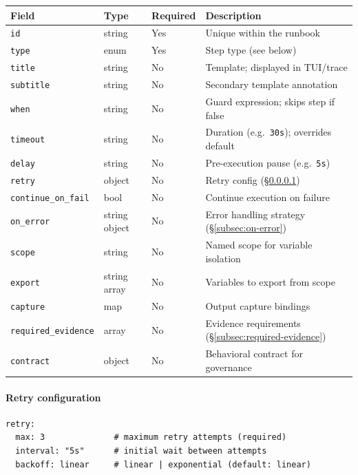 \begin{center}
\begin{tabular}{lllp{5.5cm}}
\hline
\textbf{Field} & \textbf{Type} & \textbf{Required} & \textbf{Description} \\
\hline
\texttt{id}              & string  & Yes & Unique within the runbook \\
\texttt{type}            & enum    & Yes & Step type (see below) \\
\texttt{title}           & string  & No  & Template; displayed in TUI/trace \\
\texttt{subtitle}        & string  & No  & Secondary template annotation \\
\texttt{when}            & string  & No  & Guard expression; skips step if false \\
\texttt{timeout}         & string  & No  & Duration (e.g.\ \texttt{30s}); overrides default \\
\texttt{delay}           & string  & No  & Pre-execution pause (e.g.\ \texttt{5s}) \\
\texttt{retry}           & object  & No  & Retry config (\S\ref{subsec:retry}) \\
\texttt{continue\_on\_fail} & bool & No  & Continue execution on failure \\
\texttt{on\_error}       & string \textbar{} object & No & Error handling strategy (\S\ref{subsec:on-error}) \\
\texttt{scope}           & string  & No  & Named scope for variable isolation \\
\texttt{export}          & string array & No & Variables to export from scope \\
\texttt{capture}         & map     & No  & Output capture bindings \\
\texttt{required\_evidence} & array & No & Evidence requirements (\S\ref{subsec:required-evidence}) \\
\texttt{contract}        & object  & No  & Behavioral contract for governance \\
\hline
\end{tabular}
\end{center}

\paragraph{Retry configuration}
\label{subsec:retry}

\begin{verbatim}
retry:
  max: 3              # maximum retry attempts (required)
  interval: "5s"      # initial wait between attempts
  backoff: linear     # linear | exponential (default: linear)
\end{verbatim}

